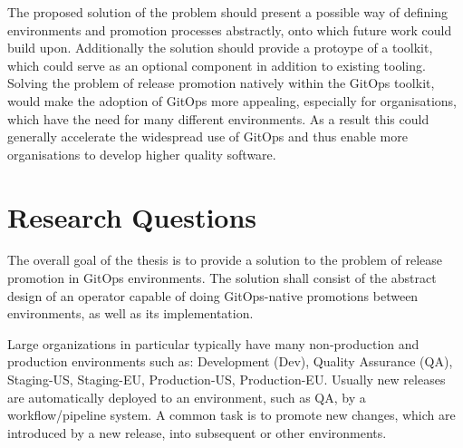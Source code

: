 
%
The proposed solution of the problem should
present a possible way of defining environments and promotion processes abstractly,
onto which future work could build upon.
%
Additionally the solution should
provide a protoype of a toolkit,
which could serve as an optional component
in addition to existing tooling.
%
Solving the problem of release promotion natively within the GitOps toolkit,
would make the adoption of GitOps more appealing,
especially for organisations, which have the need for many different environments.
%
As a result
this could generally accelerate the widespread use of GitOps
and thus enable more organisations to develop higher quality software.
%








\section{Research Questions}
\label{introduction:research-question}











%

The overall goal of the thesis is to
provide a solution to the problem of release promotion in GitOps environments.
The solution shall consist of the abstract design of an operator capable of doing
GitOps-native promotions between environments, as well as its implementation.

Large organizations in particular typically have many
non-production and production environments
such as:
Development (Dev),
Quality Assurance (QA),
Staging-US,
Staging-EU,
Production-US,
Production-EU.
Usually new releases are automatically deployed to an environment,
such as QA, 
by a workflow/pipeline system.
A common task is to promote
new changes, which are introduced by a new release,
into subsequent or other environments.

